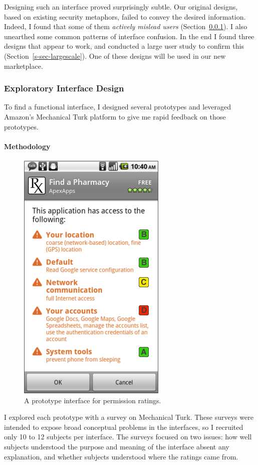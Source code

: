 \documentclass[11pt]{article}
\newcommand{\refsec}[1]{Section~\ref{#1}}
\begin{document}
Designing such an interface proved surprisingly subtle. 
Our original designs, based on existing security 
metaphors, failed to convey the desired information.
Indeed, I found that some of them \emph{actively 
mislead users} (\refsec{sec-ui-design}).
I also unearthed some common patterns of interface
confusion. In the end I found three designs that appear to work, and
conducted a large user study to confirm this
(\refsec{s-sec-largescale}). One of these designs will be used in our new
marketplace.

\subsubsection{Exploratory Interface Design}
\label{sec-ui-design}

To find a functional interface, I designed several prototypes and 
leveraged Amazon's Mechanical Turk platform to give me rapid feedback 
on those prototypes.

\paragraph{Methodology}
\label{subsec-small-methods}

\begin{figure}
\centering
    \includegraphics[width=.35\linewidth]{img/GradesPerms.png}
    \caption{A prototype interface for permission ratings.}
    \label{grade-perms}
\end{figure}

I explored each prototype with a survey on Mechanical Turk.
These surveys were 
intended to expose broad conceptual problems 
in the interfaces, so I recruited only 10 to 12 
subjects per interface. The surveys focused on two issues: how well subjects 
understood the purpose and meaning of the interface absent any explanation, 
and whether subjects understood where the ratings came from.
\end{document}

